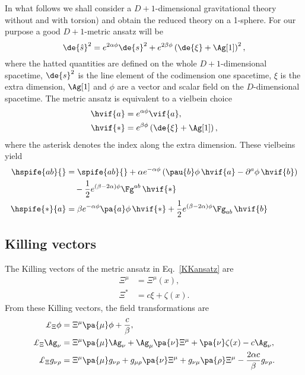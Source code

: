 \documentclass[aps,prd,12pt,superscriptaddress,showpacs,showkeys,reprint]{revtex4-1}
\begin{document}
In what follows we shall consider a $D+1$-dimensional gravitational theory without and with torsion) and obtain the reduced theory on a 1-sphere. For our purpose a good $D+1$-metric ansatz will be~\cite{Duff:1986hr,PopeKK}
\begin{equation}
  \de{\hat{s}}^2 = e^{2\alpha\phi} \de{s}^2 + e^{2 \beta \phi} \left( \de{\xi} + \Ag[1] \right)^2,
  \label{KKansatz}
\end{equation}
where the hatted quantities are defined on the whole $D+1$-dimensional spacetime, $\de{s}^2$ is the line element of the codimension one spacetime, $\xi$ is the extra dimension, $\Ag[1]$ and $\phi$ are a vector and scalar field on the $D$-dimensional spacetime. The metric ansatz is equivalent to a vielbein choice
\begin{equation}
  \begin{split}
    \hvif{a} &= e^{\alpha \phi} \vif{a}, \\
    \hvif{*} &= e^{\beta \phi} \left( \de{\xi} + \Ag[1] \right),
  \end{split}
\end{equation}
where the asterisk denotes the index along the extra dimension. These vielbeins yield 
\begin{equation}
  \begin{split}
    \hspife{ab}{} &=\spife{ab}{} + \alpha e^{-\alpha \phi} \left( \pau{b} \phi \, \hvif{a} - \partial^{a} \phi \, \hvif{b} \right) \\
    & \quad - \frac{1}{2} e^{(\beta - 2\alpha) \phi} \Fg^{a b} \, \hvif{*}
    \\
    \hspife{*}{a} &= \beta e^{-\alpha \phi} \pa{a} \phi \, \hvif{*} + \frac{1}{2} e^{(\beta - 2\alpha) \phi} \Fg_{a b} \, \hvif{b} 
  \end{split}
\end{equation}

\subsection*{Killing vectors}

The Killing vectors of the metric ansatz in Eq.~\eqref{KKansatz} are 
\begin{equation}
  \begin{split}
    \Xi^\mu &= \Xi^\mu(x), \\
    \Xi^*  &= c \xi + \zeta(x).
  \end{split}
  \label{Kvector}
\end{equation}
From these Killing vectors, the field transformations are
\begin{align}
  \label{Liephi}
  \pounds_\Xi \phi    &= \Xi^\mu \pa{\mu} \phi + \frac{c}{\beta}, \\
  \label{LieA}
  \pounds_\Xi \Ag_\nu  &= \Xi^\mu \pa{\mu} \Ag_\nu + \Ag_\mu \pa{\nu} \Xi^\mu + \pa{\nu} \zeta(x) - c \Ag_\nu, \\
  \label{Lieg}
  \pounds_\Xi g_{\nu\rho} &= \Xi^\mu \pa{\mu} g_{\nu\rho} + g_{\mu\rho} \pa{\nu} \Xi^\mu + g_{\nu\mu} \pa{\rho} \Xi^\mu - \frac{2\alpha c}{\beta} g_{\nu\rho}.
\end{align}
\end{document}
